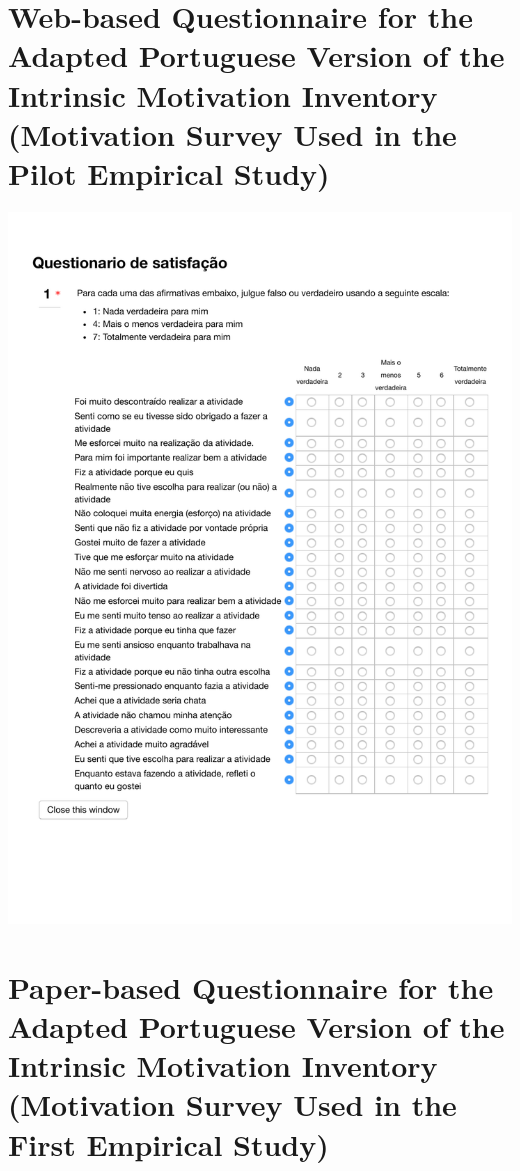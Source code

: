 \section[Web-based Questionnaire for the Adapted Portuguese IMI]{Web-based Questionnaire for the Adapted Portuguese Version of the Intrinsic Motivation Inventory (Motivation Survey Used in the Pilot Empirical Study)}
\label{annex:IMI-pilot-study}
\includegraphics[width=1\textwidth]{images/annex/IMI-pilot-study.pdf}

\newpage
\section[Paper-based Questionnaire for the Adapted Portuguese IMI]{Paper-based Questionnaire for the Adapted Portuguese Version of the Intrinsic Motivation Inventory (Motivation Survey Used in the First Empirical Study)}
\label{annex:IMI-first-study}

